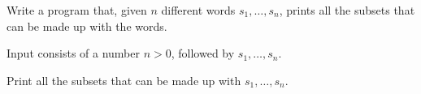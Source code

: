 

\Statement

Write a program that,
given $n$ different words $s_1, \dots, s_n$,
prints all the subsets that can be made up with the words.


\Input

Input consists of a number $n > 0$,
followed by $s_1, \dots, s_n$.


\Output

Print all the subsets that can be made up with $s_1, \dots, s_n$.


\ObservationElasticII


\Sample

